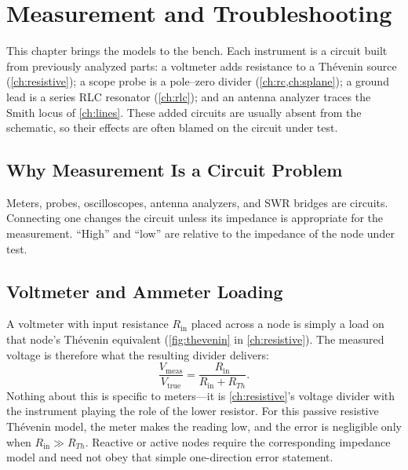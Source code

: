 \chapter{Measurement and Troubleshooting}
\label{ch:measurement}
This chapter brings the models to the bench. Each instrument is a circuit built
from previously analyzed parts: a voltmeter adds resistance to a Th\'evenin source
(\cref{ch:resistive}); a scope probe is a pole--zero divider
(\cref{ch:rc,ch:splane}); a ground lead is a series RLC resonator
(\cref{ch:rlc}); and an antenna analyzer traces the Smith locus of
\cref{ch:lines}. These added circuits are usually absent from the schematic, so
their effects are often blamed on the circuit under test.

\section{Why Measurement Is a Circuit Problem}
Meters, probes, oscilloscopes, antenna analyzers, and SWR bridges are circuits.
Connecting one changes the circuit unless its impedance is appropriate for the
measurement. ``High'' and ``low'' are relative to the impedance of the node under
test.

\section{Voltmeter and Ammeter Loading}
A voltmeter with input resistance \(R_{\mathrm{in}}\) placed across a node is simply
a load on that node's Th\'evenin equivalent (\cref{fig:thevenin} in
\cref{ch:resistive}). The measured voltage is therefore what the resulting divider
delivers:
\[
\frac{V_{\text{meas}}}{V_{\text{true}}}
=\frac{R_{\mathrm{in}}}{R_{\mathrm{in}}+R_{Th}} .
\]
Nothing about this is specific to meters---it is \cref{ch:resistive}'s voltage
divider with the instrument playing the role of the lower resistor. For this passive
resistive Th\'evenin model, the meter makes the reading low, and the error is negligible
only when \(R_{\mathrm{in}}\gg R_{Th}\). Reactive or active nodes require the
corresponding impedance model and need not obey that simple one-direction error statement.

